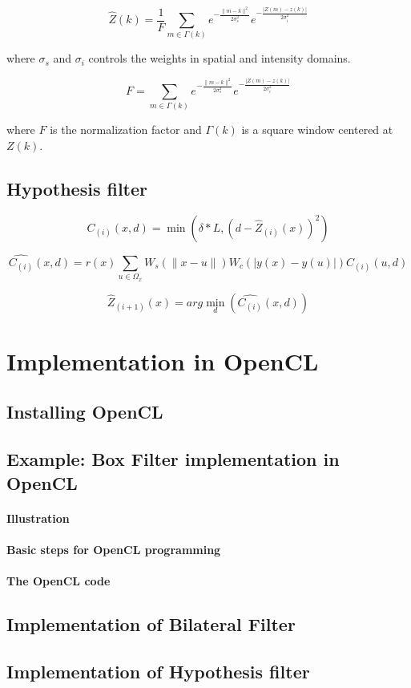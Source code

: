 \begin{equation}
\hat{Z}(k) = \frac{1}{F} \sum_{m\in\Gamma(k)} e^{-\frac{\|m-k\|^2}{2\sigma^2_s}} e^{-\frac{|Z(m)-z(k)|}{2\sigma^2_i}}
\end{equation}

where $\sigma_s$ and $\sigma_i$ controls the weights in spatial and intensity domains.

\begin{equation}
F = \sum_{m\in\Gamma(k)} e^{-\frac{\|m-k\|^2}{2\sigma^2_s}} e^{-\frac{|Z(m)-z(k)|}{2\sigma^2_i}}
\end{equation}

where $F$ is the normalization factor and $\Gamma(k)$ is a square window centered at $Z(k)$.


\subsection{Hypothesis filter}

\begin{equation}
C_{(i)}(x,d) = \min(\delta*L,(d-\hat{Z}_{(i)}(x))^2)
\end{equation}

\begin{equation}
\widehat{C_(i)}(x,d) = r(x)\sum_{u\in\Omega_x}W_s(\|x-u\|)W_c(|y(x)-y(u)|)C_{(i)}(u,d)
\end{equation}

\begin{equation}
\hat{Z}_{(i+1)}(x) = arg \min_d(\widehat{C_(i)}(x,d))
\end{equation}


\section{Implementation in OpenCL}


\subsection{Installing OpenCL}

\subsection{Example: Box Filter implementation in OpenCL}

\paragraph{Illustration}

\paragraph{Basic steps for OpenCL programming}

\paragraph{The OpenCL code}


\subsection{Implementation of Bilateral Filter}

\subsection{Implementation of Hypothesis filter}


